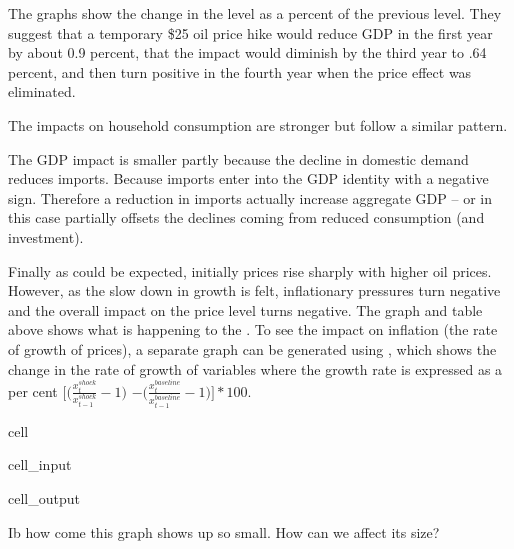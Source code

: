 \documentclass[letterpaper,10pt,english]{jupyterBook}
\begin{document}
\sphinxAtStartPar
The graphs show the change in the level as a percent of the previous level. They suggest that a temporary \$25 oil price hike would reduce GDP in the first year by about 0.9 percent, that the impact would diminish by the third year to \sphinxhyphen{}.64 percent, and then turn positive in the fourth year when the price effect was eliminated.

\sphinxAtStartPar
The impacts on household consumption are stronger but follow a similar pattern.

\sphinxAtStartPar
The GDP impact is smaller partly because the decline in domestic demand reduces imports.  Because imports enter into the GDP identity with a negative sign. Therefore a reduction in imports actually increase aggregate GDP – or in this case partially offsets the declines coming from reduced consumption (and investment).

\sphinxAtStartPar
Finally as could be expected, initially prices rise sharply with higher oil prices. However, as the slow down in growth is felt, inflationary pressures turn negative and the overall impact on the price level turns negative.  The graph and table above shows what is happening to the . To see the impact on inflation (the rate of growth of prices), a separate graph can be generated using , which shows the change in the rate of growth of variables where the growth rate is expressed as a per cent \(\bigg[\bigg(\frac{x^{shock}_t}{x^{shock}_{t-1}}-1\bigg)\) \( - \bigg(\frac{x^{baseline}_t}{x^{baseline}_{t-1}}-1\bigg)\Bigg]*100\).

\begin{sphinxuseclass}{cell}\begin{sphinxVerbatimInput}

\begin{sphinxuseclass}{cell_input}
\begin{sphinxVerbatim}[commandchars=\\\{\}]
\PYG{p}{[}\PYG{p}{]}
\end{sphinxVerbatim}

\end{sphinxuseclass}\end{sphinxVerbatimInput}
\begin{sphinxVerbatimOutput}

\begin{sphinxuseclass}{cell_output}
\noindent{}

\end{sphinxuseclass}\end{sphinxVerbatimOutput}

\end{sphinxuseclass}
\sphinxAtStartPar
 Ib how come this graph shows up so small.  How can we affect its size?
\end{document}
